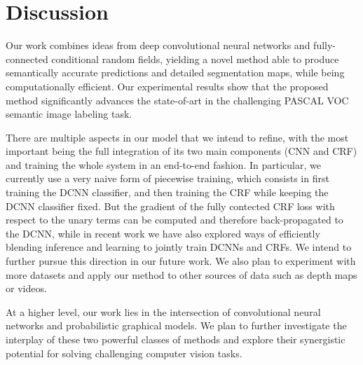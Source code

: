 \section{Discussion}
\label{sec:discussion}

Our work combines ideas from deep convolutional neural networks and
fully-connected conditional random fields, yielding a novel method able to
produce semantically accurate predictions and detailed segmentation maps,
while being computationally efficient. Our experimental results show that the
proposed method significantly advances the state-of-art in the challenging
PASCAL VOC semantic image labeling task.

There are multiple aspects in our model that we intend to refine, with the
most important being the full integration of its two main components (CNN and
CRF) and training the whole system in an end-to-end fashion.  In particular,
we currently use a very naive form of piecewise training, which consists in
first training the DCNN classifier, and then training the CRF while keeping
the DCNN classifier fixed. But the gradient of the fully contected CRF loss
with respect to the unary terms can be computed \cite{Koltun13} and therefore
back-propagated to the DCNN, while in recent work \citet{chen2014learning} we
have also explored ways of efficiently blending inference and learning to
jointly train DCNNs and CRFs. We intend to further pursue this direction in
our future work.  We also plan to experiment with more datasets and apply our
method to other sources of data such as depth maps or videos.

At a higher level, our work lies in the intersection of convolutional neural
networks and probabilistic graphical models. We plan to further investigate
the interplay of these two powerful classes of methods and explore their
synergistic potential for solving challenging computer vision tasks.
